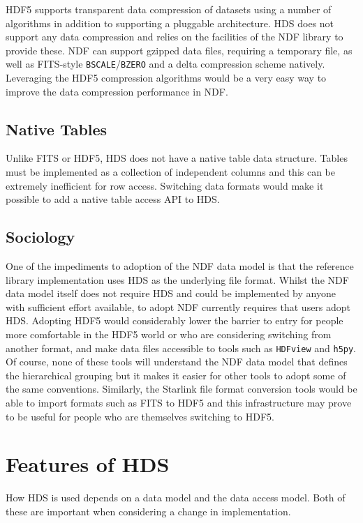 \documentclass[final,authoryear,5p,times,twocolumn]{elsarticle}
\begin{document}
HDF5 supports transparent data compression of datasets using a number
of algorithms in addition to supporting a pluggable architecture. HDS
does not support any data compression and relies on the facilities of
the NDF library to provide these. NDF can support gzipped data files,
requiring a temporary file, as well as FITS-style
\texttt{BSCALE}/\texttt{BZERO} and a delta compression scheme
natively. Leveraging the HDF5 compression algorithms would be a very
easy way to improve the data compression performance in NDF.

\subsection{Native Tables}

Unlike FITS \citep{1988A&AS...73..365H} or HDF5, HDS does not have a
native table data structure. Tables must be implemented as a
collection of independent columns and this can be extremely
inefficient for row access. Switching data formats would make it
possible to add a native table access API to HDS.

\subsection{Sociology}

One of the impediments to adoption of the NDF data model is that the
reference library implementation uses HDS as the underlying file
format. Whilst the NDF data model itself does not require HDS and
could be implemented by anyone with sufficient effort available, to
adopt NDF currently requires that users adopt HDS.
Adopting HDF5 would considerably lower the barrier to entry for people
more comfortable in the HDF5 world or who are considering switching
from another format, and make
data files accessible to tools such as \texttt{HDFview} and
\texttt{h5py}. Of course, none of these tools will understand the NDF
data model that defines the hierarchical grouping but it makes it
easier for other tools to adopt some of the same conventions.
Similarly, the Starlink file format conversion tools \citep{SUN55} would be able
to import formats such as FITS to HDF5 and this infrastructure may
prove to be useful for people who are themselves switching to HDF5.

\section{Features of HDS}

How HDS is used depends on a data model and the data access
model. Both of these are important when considering a change in
implementation.
\end{document}
